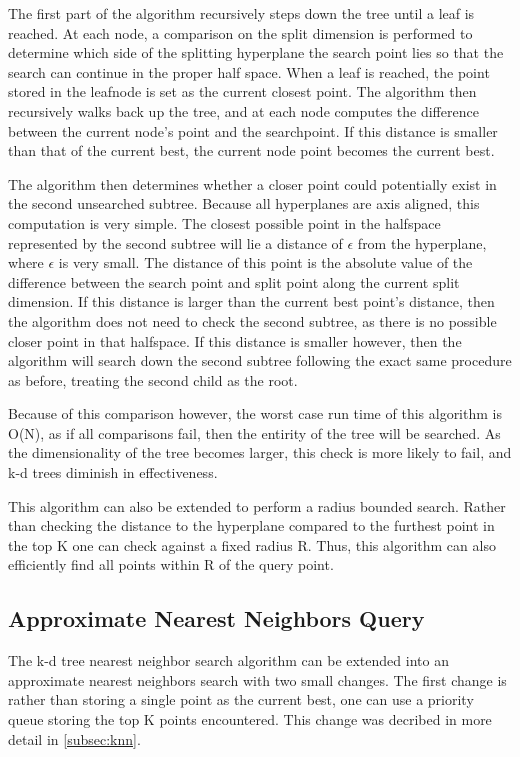 The first part of the algorithm recursively steps down the tree until a leaf is reached.  At each node, a comparison on the split dimension is performed to determine which side of the splitting hyperplane the search point lies so that the search can continue in the proper half space.  When a leaf is reached, the point stored in the leafnode is set as the current closest point.  The algorithm then recursively walks back up the tree, and at each node computes the difference between the current node's point and the searchpoint.  If this distance is smaller than that of the current best, the current node point becomes the current best.

The algorithm then determines whether a closer point could potentially exist in the second unsearched subtree.  Because all hyperplanes are axis aligned, this computation is very simple.  The closest possible point in the halfspace represented by the second subtree will lie a distance of $\epsilon$ from the hyperplane, where $\epsilon$ is very small.  The distance of this point is the absolute value of the difference between the search point and split point along the current split dimension.  If this distance is larger than the current best point's distance, then the algorithm does not need to check the second subtree, as there is no possible closer point in that halfspace.  If this distance is smaller however, then the algorithm will search down the second subtree following the exact same procedure as before, treating the second child as the root.

Because of this comparison however, the worst case run time of this algorithm is O(N), as if all comparisons fail, then the entirity of the tree will be searched.  As the dimensionality of the tree becomes larger, this check is more likely to fail, and k-d trees diminish in effectiveness.

This algorithm can also be extended to perform a radius bounded search.  Rather than checking the distance to the hyperplane compared to the furthest point in the top K one can check against a fixed radius R.  Thus, this algorithm can also efficiently find all points within R of the query point.

\subsection{Approximate Nearest Neighbors Query}

The k-d tree nearest neighbor search algorithm can be extended into an approximate nearest neighbors search with two small changes.  The first change is rather than storing a single point as the current best, one can use a priority queue storing the top K points encountered.  This change was decribed in more detail in \ref{subsec:knn}.

